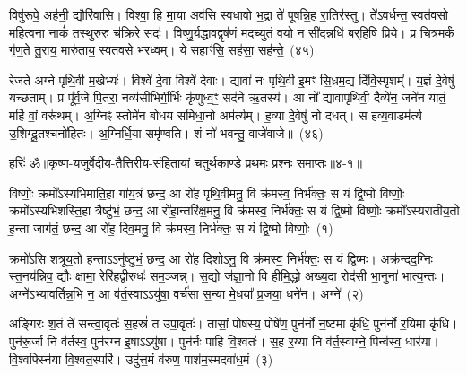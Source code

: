 विषु॑रूपे॒ अह॑नी॒ द्यौरि॑वासि। विश्वा॒ हि मा॒या अव॑सि स्वधावो भ॒द्रा ते॑ पूषन्नि॒ह रा॒तिर॑स्तु। ते॑\-ऽवर्धन्त॒ स्वत॑वसो महित्व॒ना नाकं॑ त॒स्थुरु॒रु च॑क्रिरे॒ सदः॑। विष्णु॒र्यद्धाव॒द्वृष॑णं मद॒च्युतं॒ वयो॒ न सी॑द॒न्नधि॑ ब॒र्॒\mbox{}हिषि॑ प्रि॒ये। प्र चि॒त्रम॒र्कं गृ॑ण॒ते तु॒राय॒ मारु॑ताय॒ स्वत॑वसे भरध्वम्। ये सहाꣳ॑सि॒ सह॑सा॒ सह॑न्ते॒~(४५)

रेज॑ते अग्ने पृथि॒वी म॒खेभ्यः॑। विश्वे॑ दे॒वा विश्वे॑ देवाः। द्यावा॑ नः पृथि॒वी इ॒मꣳ सि॒ध्रम॒द्य दि॑वि॒स्पृशम्᳚। य॒ज्ञं दे॒वेषु॑ यच्छताम्। प्र पू᳚र्व॒जे पि॒तरा॒ नव्य॑सीभिर्गी॒र्भिः कृ॑णुध्व॒ꣳ॒ सद॑ने ऋ॒तस्य॑। आ नो᳚ द्यावा\-पृथिवी॒ दैव्ये॑न॒ जने॑न यातं॒ महि॑ वां॒ वरू॑थम्। अ॒ग्निꣴ स्तोमे॑न बोधय समिधा॒नो अम॑र्त्यम्। ह॒व्या दे॒वेषु॑ नो दधत्। स ह॑व्य॒वाडम॑र्त्य उ॒शिग्दू॒तश्चनो॑हितः। अ॒ग्निर्धि॒या समृ॑ण्वति। शं नो॑ भवन्तु॒ वाजे॑वाजे॥~(४६)

{\anuvakamend[{पू॒रु॒ष॒त्वता॑ यज॒तन्ते॑ अ॒न्यथ्सह॑न्ते॒ चनो॑हितो॒\-ऽष्टौ च॑}]}%

{हरिः॑ ॐ}{॥कृष्ण-यजुर्वेदीय-तैत्तिरीय-संहितायां चतुर्थकाण्डे प्रथमः प्रश्नः समाप्तः॥४-१॥}

\setcounter{anuvakam}{0}
विष्णोः॒ क्रमो᳚\-ऽस्यभिमाति॒हा गा॑य॒त्रं छन्द॒ आ रो॑ह पृथि॒वीमनु॒ वि क्र॑मस्व॒ निर्भ॑क्तः॒ स यं द्वि॒ष्मो विष्णोः॒ क्रमो᳚\-ऽस्यभिशस्ति॒हा त्रैष्टु॑भं॒ छन्द॒ आ रो॑हा॒न्तरि॑क्ष॒मनु॒ वि क्र॑मस्व॒ निर्भ॑क्तः॒ स यं द्वि॒ष्मो विष्णोः॒ क्रमो᳚\-ऽस्यरातीय॒तो ह॒न्ता जाग॑तं॒ छन्द॒ आ रो॑ह॒ दिव॒मनु॒ वि क्र॑मस्व॒ निर्भ॑क्तः॒ स यं द्वि॒ष्मो विष्णोः॒~(१)

क्रमो॑\-ऽसि शत्रूय॒तो ह॒न्ताऽऽनु॑ष्टुभं॒ छन्द॒ आ रो॑ह॒ दिशो\-ऽनु॒ वि क्र॑मस्व॒ निर्भ॑क्तः॒ स यं द्वि॒ष्मः। अक्र॑न्दद॒ग्निः स्त॒नय॑न्निव॒ द्यौः क्षामा॒ रेरि॑हद्वी॒रुधः॑ सम॒ञ्जन्न्। स॒द्यो ज॑ज्ञा॒नो वि हीमि॒द्धो अख्य॒दा रोद॑सी भा॒नुना॑ भात्य॒न्तः। अग्ने᳚\-ऽभ्यावर्तिन्न॒भि न॒ आ व॑र्त॒स्वाऽऽयु॑षा॒ वर्च॑सा स॒न्या मे॒धया᳚ प्र॒जया॒ धने॑न। अग्ने॑~(२)

अङ्गिरः श॒तं ते॑ सन्त्वा॒वृतः॑ स॒हस्रं॑ त उपा॒वृतः॑। तासां॒ पोष॑स्य॒ पोषे॑ण॒ पुन॑र्नो न॒ष्टमा कृ॑धि॒ पुन॑र्नो र॒यिमा कृ॑धि। पुन॑रू॒र्जा नि व॑र्तस्व॒ पुन॑रग्न इ॒षा\-ऽ\-ऽ\-यु॑षा। पुन॑र्नः पाहि वि॒श्वतः॑। स॒ह र॒य्या नि व॑र्त॒स्वाग्ने॒ पिन्व॑स्व॒ धार॑या। वि॒श्वफ्स्नि॑या वि॒श्वत॒स्परि॑। उदु॑त्त॒मं व॑रुण॒ पाश॑म॒स्मदवा॑ध॒मं~(३)

